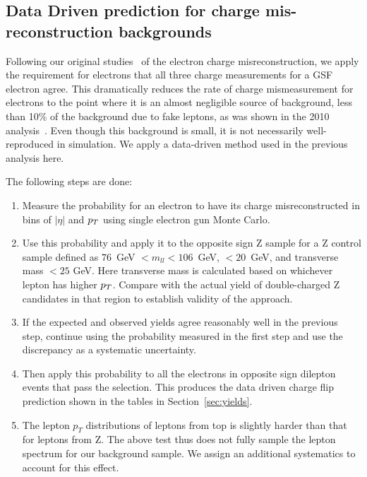 \subsection{Data Driven prediction for charge mis-reconstruction backgrounds}
\label{sec:flips}


Following our original studies~\cite{sspaper2010} of the electron charge misreconstruction, 
we apply the requirement for electrons that all three charge measurements for a GSF electron agree. 
This dramatically reduces the rate of charge mismeasurement for electrons to the point where it 
is an almost negligible source of background, less than 10\% of the background due to fake leptons, 
as was shown in the 2010 analysis~\cite{sspaper2010}.
Even though this background is small, it is not necessarily well-reproduced in simulation.
We apply a data-driven method used in the previous analysis here.

The following steps are done:
\begin{enumerate}
\item Measure the probability for an electron to have its charge misreconstructed 
in bins of $|\eta |$ and $p_T$ using single electron gun Monte Carlo.
\item Use this probability and apply it to the opposite sign Z sample for a Z control sample 
defined as $76$\ GeV $ < m_{ll} < 106$\ GeV,  \met $ < 20$\ GeV,
and transverse mass $< 25$ GeV. 
Here transverse mass is calculated based on whichever lepton has higher $p_T$. 
Compare with the actual yield of double-charged Z candidates in that region to establish validity of the approach.
\item If the expected and observed yields agree reasonably well in the previous step, continue using
	the probability measured in the first step and use the discrepancy as a systematic uncertainty.
\item Then apply this probability to all the electrons in opposite sign dilepton events that pass the selection. 
	This produces the data driven charge flip  prediction shown in the tables in Section~\ref{sec:yields}. 
\item The lepton $p_T$ distributions of leptons from top is slightly harder than that for leptons from Z. The above
test thus does not fully sample the lepton spectrum for our background sample. We assign an additional systematics
to account for this effect.
\end{enumerate}

